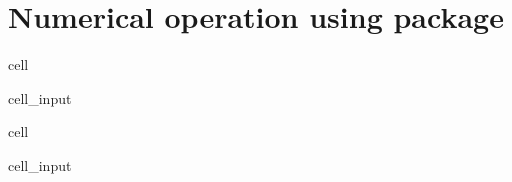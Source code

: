 \documentclass[letterpaper,10pt,english]{jupyterBook}
\begin{document}
\section{Numerical operation using  package}
\label{\detokenize{notebooks/getting_started/basic_math:numerical-operation-using-numpy-package}}
\begin{sphinxuseclass}{cell}\begin{sphinxVerbatimInput}

\begin{sphinxuseclass}{cell_input}
\begin{sphinxVerbatim}[commandchars=\\\{\}]
   
\end{sphinxVerbatim}

\end{sphinxuseclass}\end{sphinxVerbatimInput}

\end{sphinxuseclass}
\begin{sphinxuseclass}{cell}\begin{sphinxVerbatimInput}

\begin{sphinxuseclass}{cell_input}
\begin{sphinxVerbatim}[commandchars=\\\{\}]
   
\end{sphinxVerbatim}

\end{sphinxuseclass}\end{sphinxVerbatimInput}

\end{sphinxuseclass}
\end{document}
